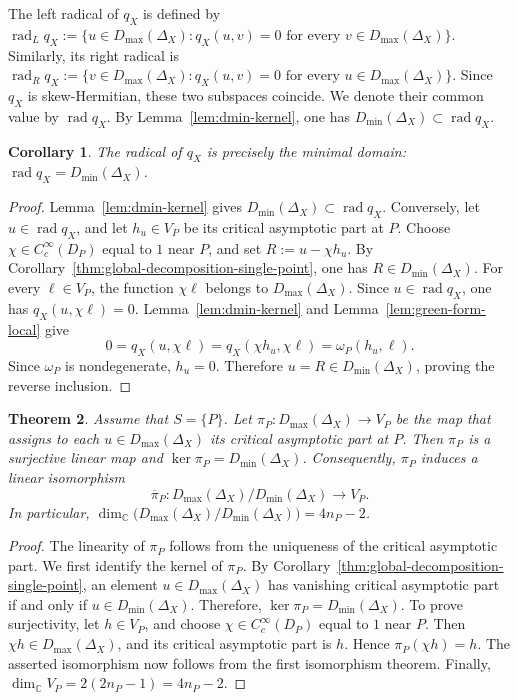 \documentclass[12pt]{amsart}
\theoremstyle{plain}
\newtheorem{thm}{Theorem}[section]
\newtheorem{cor}[thm]{Corollary}
\theoremstyle{definition}
\theoremstyle{remark}
\numberwithin{equation}{section} \numberwithin{figure}{section}
\renewcommand*{\to}{\rightarrow}
\begin{document}
The left radical of \(q_X\) is defined by
\(\operatorname{rad}_{L}q_X
:=\{u\in D_{\max}(\Delta_X):
q_X(u,v)=0\text{ for every }v\in D_{\max}(\Delta_X)\}\).
Similarly, its right radical is
\(\operatorname{rad}_{R}q_X
:=\{v\in D_{\max}(\Delta_X):
q_X(u,v)=0\text{ for every }u\in D_{\max}(\Delta_X)\}\).
Since \(q_X\) is skew-Hermitian, these two subspaces coincide. We denote
their common value by \(\operatorname{rad}q_X\). By
Lemma~\ref{lem:dmin-kernel}, one has
\(D_{\min}(\Delta_X)\subset\operatorname{rad}q_X\).



\begin{cor}\label{cor:rad-q-dmin}
The radical of \(q_X\) is precisely the minimal domain:
\(\operatorname{rad}q_X=D_{\min}(\Delta_X)\).
\end{cor}

\begin{proof}
Lemma~\ref{lem:dmin-kernel} gives
\(D_{\min}(\Delta_X)\subset\operatorname{rad}q_X\).
Conversely, let \(u\in\operatorname{rad}q_X\), and let \(h_u\in V_P\)
be its critical asymptotic part at \(P\). Choose
\(\chi\in C_c^\infty(D_P)\) equal to \(1\) near \(P\), and set
\(R:=u-\chi h_u\). By
Corollary~\ref{thm:global-decomposition-single-point}, one has
\(R\in D_{\min}(\Delta_X)\).
For every \(\ell\in V_P\), the function \(\chi\ell\) belongs to
\(D_{\max}(\Delta_X)\). Since \(u\in\operatorname{rad}q_X\), one has
\(q_X(u,\chi\ell)=0\). Lemma~\ref{lem:dmin-kernel} and
Lemma~\ref{lem:green-form-local} give
\[
0
=
q_X(u,\chi\ell)
=
q_X(\chi h_u,\chi\ell)
=
\omega_P(h_u,\ell).
\]
Since \(\omega_P\) is nondegenerate, \(h_u=0\). Therefore
\(u=R\in D_{\min}(\Delta_X)\), proving the reverse inclusion.
\end{proof}


\begin{thm}\label{thm:quotient-is-Vp}
Assume that \(S=\{P\}\). Let
\(\pi_P:D_{\max}(\Delta_X)\to V_P\) be the map that assigns to each
\(u\in D_{\max}(\Delta_X)\) its critical asymptotic part at \(P\).
Then \(\pi_P\) is a surjective linear map and
\(\ker\pi_P=D_{\min}(\Delta_X)\). Consequently, \(\pi_P\) induces a
linear isomorphism
\[
\overline{\pi}_P:
D_{\max}(\Delta_X)/D_{\min}(\Delta_X)
\longrightarrow V_P.
\]
In particular,
\(\dim_{\mathbb C}\bigl(D_{\max}(\Delta_X)/
D_{\min}(\Delta_X)\bigr)=4n_P-2\).
\end{thm}

\begin{proof}
The linearity of \(\pi_P\) follows from the uniqueness of the critical
asymptotic part. We first identify the kernel of \(\pi_P\). By
Corollary~\ref{thm:global-decomposition-single-point}, an element
\(u\in D_{\max}(\Delta_X)\) has vanishing critical asymptotic part if
and only if \(u\in D_{\min}(\Delta_X)\). Therefore,
\(\ker\pi_P=D_{\min}(\Delta_X)\).
To prove surjectivity, let \(h\in V_P\), and choose
\(\chi\in C_c^\infty(D_P)\) equal to \(1\) near \(P\). Then
\(\chi h\in D_{\max}(\Delta_X)\), and its critical asymptotic part is
\(h\). Hence \(\pi_P(\chi h)=h\).
The asserted isomorphism now follows from the first isomorphism
theorem. Finally,
\(\dim_{\mathbb C}V_P=2(2n_P-1)=4n_P-2\).
\end{proof}
\end{document}
